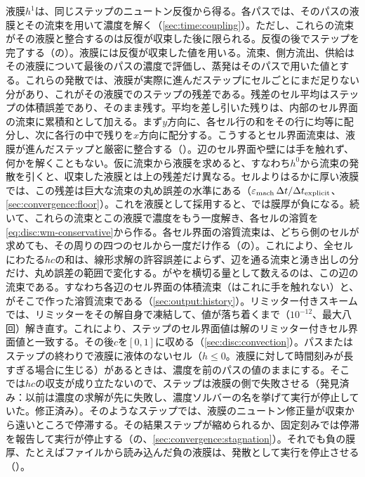 液膜$h^{1}$は、同じステップのニュートン反復から得る。各パスでは、そのパスの液膜とその流束を用いて濃度を解く（\cref{sec:time:coupling}）。ただし、これらの流束がその液膜と整合するのは反復が収束した後に限られる。反復の後でステップを完了する（の）。液膜には反復が収束した値を用いる。流束、側方流出、供給はその液膜について最後のパスの濃度で評価し、蒸発はそのパスで用いた値とする。これらの発散では、液膜が実際に進んだステップにセルごとにまだ足りない分があり、これがその液膜でのステップの残差である。残差のセル平均はステップの体積誤差であり、そのまま残す。平均を差し引いた残りは、内部のセル界面の流束に累積和として加える。まず$y$方向に、各セル行の和をその行に均等に配分し、次に各行の中で残りを$x$方向に配分する。こうするとセル界面流束は、液膜が進んだステップと厳密に整合する（）。辺のセル界面や壁には手を触れず、何かを解くこともない。仮に流束から液膜を求めると、すなわち$h^{0}$から流束の発散を引くと、収束した液膜とは上の残差だけ異なる。セルよりはるかに厚い液膜では、この残差は巨大な流束の丸め誤差の水準にある（$\varepsilon_{\mathrm{mach}}\,\Delta t/\Delta t_{\mathrm{explicit}}$、\cref{sec:convergence:floor}）。これを液膜として採用すると、では膜厚が負になる。続いて、これらの流束とこの液膜で濃度をもう一度解き、各セルの溶質を\cref{eq:disc:wm-conservative}から作る。各セル界面の溶質流束は、どちら側のセルが求めても、その周りの四つのセルから一度だけ作る（の）。これにより、全セルにわたる$hc$の和は、線形求解の許容誤差によらず、辺を通る流束と湧き出しの分だけ、丸め誤差の範囲で変化する。がやを横切る量として数えるのは、この辺の流束である。すなわち各辺のセル界面の体積流束（はこれに手を触れない）と、がそこで作った溶質流束である（\cref{sec:output:history}）。リミッター付きスキームでは、リミッターをその解自身で凍結して、値が落ち着くまで（$10^{-12}$、最大八回）解き直す。これにより、ステップのセル界面値は解のリミッター付きセル界面値と一致する。その後$c$を$[0, 1]$に収める（\cref{sec:disc:convection}）。パスまたはステップの終わりで液膜に液体のないセル（$h \le 0$。液膜に対して時間刻みが長すぎる場合に生じる）があるときは、濃度を前のパスの値のままにする。そこでは$hc$の収支が成り立たないので、ステップは液膜の側で失敗させる（発見済み：以前は濃度の求解が先に失敗し、濃度ソルバーの名を挙げて実行が停止していた。修正済み）。そのようなステップでは、液膜のニュートン修正量が収束から遠いところで停滞する。その結果ステップが縮められるか、固定刻みでは停滞を報告して実行が停止する（の、\cref{sec:convergence:stagnation}）。それでも負の膜厚、たとえばファイルから読み込んだ負の液膜は、発散として実行を停止させる（）。

